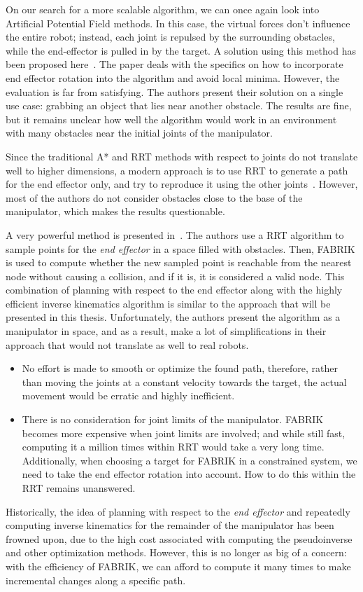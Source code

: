 On our search for a more scalable algorithm, we can once again look into Artificial Potential Field methods. In this case, the virtual forces don't influence the entire robot; instead, each joint is repulsed by the surrounding obstacles, while the end-effector is pulled in by the target. A solution using this method has been proposed here~\cite{aapf}. The paper deals with the specifics on how to incorporate end effector rotation into the algorithm and avoid local minima. However, the evaluation is far from satisfying. The authors present their solution on a single use case: grabbing an object that lies near another obstacle. The results are fine, but it remains unclear how well the algorithm would work in an environment with many obstacles near the initial joints of the manipulator.

Since the traditional A* and RRT methods with respect to joints do not translate well to higher dimensions, a modern approach is to use RRT to generate a path for the end effector only, and try to reproduce it using the other joints~\cite{RRT_manipulator, rrt_industrial}. However, most of the authors do not consider obstacles close to the base of the manipulator, which makes the results questionable.

A very powerful method is presented in~\cite{rrt_fabrik}. The authors use a RRT algorithm to sample points for the \textit{end effector} in a space filled with obstacles. Then, FABRIK is used to compute whether the new sampled point is reachable from the nearest node without causing a collision, and if it is, it is considered a valid node. This combination of planning with respect to the end effector along with the highly efficient inverse kinematics algorithm is similar to the approach that will be presented in this thesis. Unfortunately, the authors present the algorithm as a manipulator in space, and as a result, make a lot of simplifications in their approach that would not translate as well to real robots.

\begin{itemize}
  \item No effort is made to smooth or optimize the found path, therefore, rather than moving the joints at a constant velocity towards the target, the actual movement would be erratic and highly inefficient.

  \item There is no consideration for joint limits of the manipulator. FABRIK becomes more expensive when joint limits are involved; and while still fast, computing it a million times within RRT would take a very long time. Additionally, when choosing a target for FABRIK in a constrained system, we need to take the end effector rotation into account. How to do this within the RRT remains unanswered.
\end{itemize}

Historically, the idea of planning with respect to the \textit{end effector} and repeatedly computing inverse kinematics for the remainder of the manipulator has been frowned upon, due to the high cost associated with computing the pseudoinverse and other optimization methods. However, this is no longer as big of a concern: with the efficiency of FABRIK, we can afford to compute it many times to make incremental changes along a specific path.
